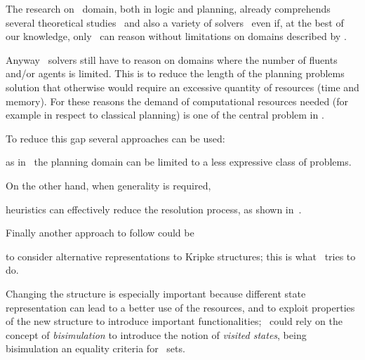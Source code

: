 		
The research on \mAGep\ domain, both in logic and planning, already comprehends several theoretical studies~\cite{fagin1994reasoning,moore1981reasoning,gerbrandy1999bisimulations,van2008handbook,van1997complete,van2007dynamic,baral2015action,aucher2013undecidability,bolander2015complexity,van2004dynamic} and also a variety of solvers~\cite{kominis2015beliefs,huang2017general,muise2015planning,wan2015complete,liu2018multi,le2018efp} even if, at the best of our knowledge, only~\cite{le2018efp,van2004dynamic} can reason without limitations on domains described by \lagC. 
	
Anyway \mAGep\ solvers still have to reason on domains where the number of fluents and/or agents is limited.
This is to reduce the length of the planning problems solution that otherwise would require an  excessive quantity of resources (\ie time and memory).
For these reasons the demand of computational resources needed (for example in respect to classical planning) is one of the central problem in \mep.
	
To reduce this gap several approaches can be used:
\begin{enumerate*}[label=\roman*)]
	\item as in~\cite{kominis2015beliefs,huang2017general,muise2015planning,wan2015complete} the planning domain can be limited to a less expressive class of problems.
	
	On the other hand, when generality is required, \item heuristics can effectively reduce the resolution process, as shown in~\cite{le2018efp}.
	
	Finally another approach to follow could be \item to consider alternative representations to Kripke structures; this is what \ourL\ tries to do.
\end{enumerate*} 
	
Changing the structure is especially important because different state representation can lead to a better use of the resources, and to exploit properties of the new structure to introduce important functionalities; \eg \ourL\ could rely on the concept of \emph{bisimulation} to introduce the notion of \emph{visited states}, being bisimulation an equality criteria for \nwf\ sets.%
	
